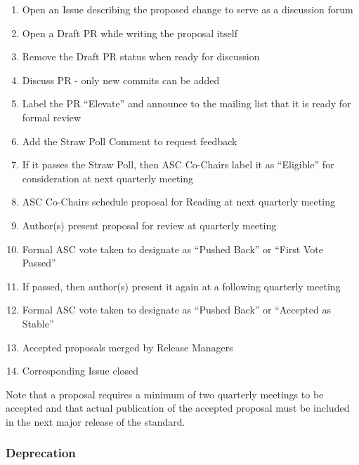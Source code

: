 \documentclass{article}
\providecommand{\tightlist}{%
  \setlength{\itemsep}{0pt}\setlength{\parskip}{0pt}}
\begin{document}
\begin{enumerate}
\def\labelenumi{\arabic{enumi}.}
\tightlist
\item
  Open an Issue describing the proposed change to serve as a discussion
  forum
\item
  Open a Draft PR while writing the proposal itself
\item
  Remove the Draft PR status when ready for discussion
\item
  Discuss PR - only new commits can be added
\item
  Label the PR ``Elevate'' and announce to the mailing list that it is
  ready for formal review
\item
  Add the Straw Poll Comment to request feedback
\item
  If it passes the Straw Poll, then ASC Co-Chairs label it as
  ``Eligible'' for consideration at next quarterly meeting
\item
  ASC Co-Chairs schedule proposal for Reading at next quarterly
  meeting
\item
  Author(s) present proposal for review at quarterly meeting
\item
  Formal ASC vote taken to designate as ``Pushed Back'' or ``First Vote
  Passed''
\item
  If passed, then author(s) present it again at a following quarterly
  meeting
\item
  Formal ASC vote taken to designate as ``Pushed Back'' or ``Accepted as
  Stable''
\item
  Accepted proposals merged by Release Managers
\item
  Corresponding Issue closed
\end{enumerate}

Note that a proposal requires a minimum of two quarterly meetings to be
accepted and that actual publication of the accepted proposal must be
included in the next major release of the standard.

\hypertarget{deprecation}{%
\subsubsection{Deprecation}%
\label{deprecation}}
\end{document}
